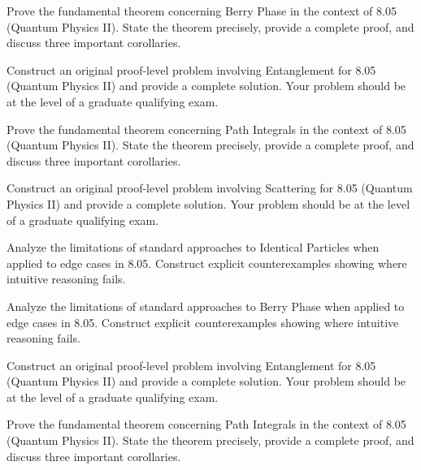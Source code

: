 \documentclass[12pt,a4paper]{exam}
\begin{document}
\begin{questions}
\vspace{0.3cm}

\question[4]
Prove the fundamental theorem concerning Berry Phase in the context of 8.05 (Quantum Physics II). State the theorem precisely, provide a complete proof, and discuss three important corollaries.

\vspace{0.3cm}

\question[4]
Construct an original proof-level problem involving Entanglement for 8.05 (Quantum Physics II) and provide a complete solution. Your problem should be at the level of a graduate qualifying exam.

\vspace{0.3cm}

\question[2]
Prove the fundamental theorem concerning Path Integrals in the context of 8.05 (Quantum Physics II). State the theorem precisely, provide a complete proof, and discuss three important corollaries.

\vspace{0.3cm}

\question[4]
Construct an original proof-level problem involving Scattering for 8.05 (Quantum Physics II) and provide a complete solution. Your problem should be at the level of a graduate qualifying exam.

\vspace{0.3cm}

\question[5]
Analyze the limitations of standard approaches to Identical Particles when applied to edge cases in 8.05. Construct explicit counterexamples showing where intuitive reasoning fails.

\vspace{0.3cm}

\question[2]
Analyze the limitations of standard approaches to Berry Phase when applied to edge cases in 8.05. Construct explicit counterexamples showing where intuitive reasoning fails.

\vspace{0.3cm}

\question[2]
Construct an original proof-level problem involving Entanglement for 8.05 (Quantum Physics II) and provide a complete solution. Your problem should be at the level of a graduate qualifying exam.

\vspace{0.3cm}

\question[3]
Prove the fundamental theorem concerning Path Integrals in the context of 8.05 (Quantum Physics II). State the theorem precisely, provide a complete proof, and discuss three important corollaries.


\end{questions}
\end{document}
